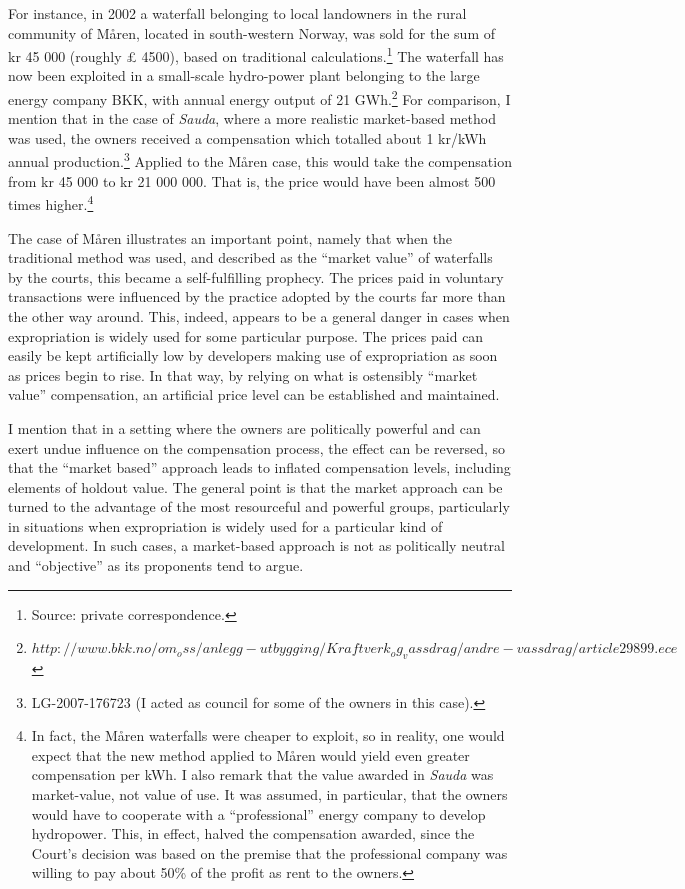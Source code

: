 For instance, in 2002 a waterfall belonging to local landowners in the rural community of Måren, located in south-western Norway, was sold for the sum of kr 45 000 (roughly £ 4500), based on traditional calculations.\footnote{Source: private correspondence.} The waterfall has now been exploited in a small-scale hydro-power plant belonging to the large energy company BKK, with annual energy output of 21 GWh.\footnote{$http://www.bkk.no/om_oss/anlegg-utbygging/Kraftverk_og_vassdrag/andre-vassdrag/article29899.ece$} For comparison, I mention that in the case of \emph{Sauda}, where a more realistic market-based method was used, the owners received a compensation which totalled about 1 kr/kWh annual production.\footnote{LG-2007-176723 (I acted as council for some of the owners in this case).} Applied to the Måren case, this would take the compensation from kr 45 000 to kr 21 000 000. That is, the price would have been almost 500 times higher.\footnote{In fact, the Måren waterfalls were cheaper to exploit, so in reality, one would expect that the new method applied to Måren would yield even greater compensation per kWh. I also remark that the value awarded in \emph{Sauda} was market-value, not value of use. It was assumed, in particular, that the owners would have to cooperate with a ``professional'' energy company to develop hydropower. This, in effect, halved the compensation awarded, since the Court's decision was based on the premise that the professional company was willing to pay about 50\% of the profit as rent to the owners.}

The case of Måren illustrates an important point, namely that when the traditional method was used, and described as the ``market value'' of waterfalls by the courts, this became a self-fulfilling prophecy. The prices paid in voluntary transactions were influenced by the practice adopted by the courts far more than the other way around. This, indeed, appears to be a general danger in cases when expropriation is widely used for some particular purpose. The prices paid can easily be kept artificially low by developers making use of expropriation as soon as prices begin to rise. In that way, by relying on what is ostensibly ``market value'' compensation, an artificial price level can be established and maintained. 

I mention that in a setting where the owners are politically powerful and can exert undue influence on the compensation process, the effect can be reversed, so that the ``market based'' approach leads to inflated compensation levels, including elements of holdout value. The general point is that the market approach can be turned to the advantage of the most resourceful and powerful groups, particularly in situations when expropriation is widely used for a particular kind of development. In such cases, a market-based approach is not as politically neutral and ``objective'' as its proponents tend to argue.


